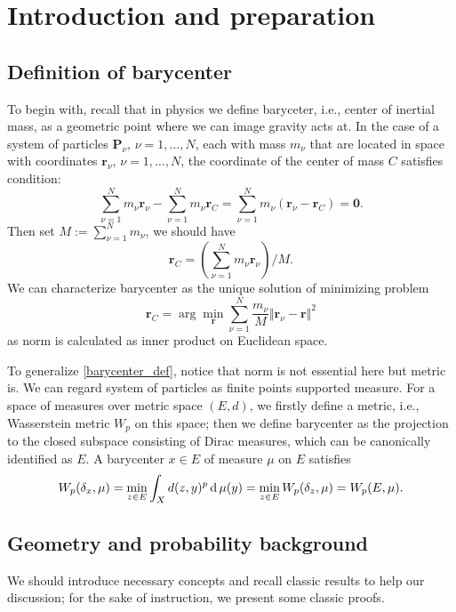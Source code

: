 \chapter{Introduction and preparation}
\section{Definition of barycenter}
To begin with, recall that in physics we define baryceter, i.e.,  center of inertial mass, as a geometric point where we can image gravity acts at. In the case of a system of particles $\boldsymbol{P}_\nu$, $\nu = 1, \ldots , N$, each with mass $m_\nu$ that are located in space with coordinates $\boldsymbol{r}_\nu$, $\nu = 1, \ldots , N$, the coordinate of the center of mass $C$ satisfies condition:
\[
	\sum _{\nu=1}^{N} m_{\nu}\boldsymbol {r}_{\nu} -	\sum _{\nu=1}^{N}m_{\nu}\boldsymbol {r}_C = \sum _{\nu=1}^{N}m_{\nu}(\boldsymbol {r} _{\nu}-\boldsymbol {r}_C )=\boldsymbol {0}.
\]
Then set \( M := \sum _ { \nu = 1 } ^ { N } m _ { \nu } \), we should have
\[
	\boldsymbol { r }_ { C } = \left( \sum_ { \nu = 1 } ^ { N } m_ { \nu } \boldsymbol { r }_ { \nu } \right) / M .
\]
We can characterize barycenter as the unique solution of minimizing problem
\begin{equation}
	\label{barycenter_def}
	\boldsymbol{r}_C = \operatorname{arg} \min_{\boldsymbol{r}} \sum_{\nu= 1}^N \frac{m_\nu}{M} \Vert \boldsymbol{r}_{\nu} - \boldsymbol{r}\Vert^2
\end{equation}
as norm is calculated as inner product on Euclidean space.

To generalize \cref{barycenter_def}, notice that norm is not essential here but metric is. We can regard system of particles as finite points supported measure. For a space of measures over metric space $(E,d)$, we firstly define a metric, i.e., Wasserstein metric $W_p$ on this space; then we define barycenter as the projection to the closed subspace consisting of Dirac measures, which can be canonically identified as $E$.
A barycenter $x \in E$ of measure $\mu$ on $E$ satisfies
\[
	W_p(\delta_x, \mu) = \min_{z \in E} \int_{X} d(z, y)^p \operatorname{d} \mu(y) = \min_{z \in E} W_p(\delta_z, \mu)= W_p(E, \mu).
\]

\section{Geometry and probability background}
We should introduce necessary concepts and recall classic results to help our discussion; for the sake of instruction, we present some classic proofs.

